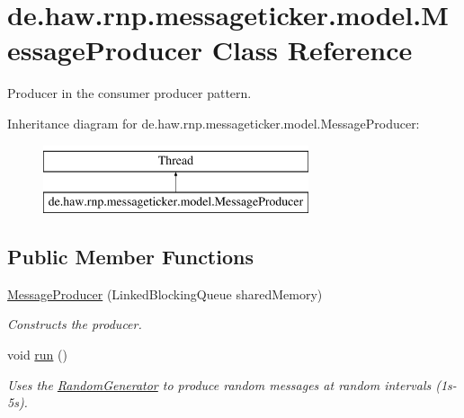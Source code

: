 \hypertarget{classde_1_1haw_1_1rnp_1_1messageticker_1_1model_1_1MessageProducer}{\section{de.\-haw.\-rnp.\-messageticker.\-model.\-Message\-Producer Class Reference}
\label{classde_1_1haw_1_1rnp_1_1messageticker_1_1model_1_1MessageProducer}
}


Producer in the consumer producer pattern.  


Inheritance diagram for de.\-haw.\-rnp.\-messageticker.\-model.\-Message\-Producer\-:\begin{figure}[H]
\begin{center}
\leavevmode
\includegraphics[height=2.000000cm]{classde_1_1haw_1_1rnp_1_1messageticker_1_1model_1_1MessageProducer}
\end{center}
\end{figure}
\subsection*{Public Member Functions}
\begin{DoxyCompactItemize}
\item 
\hyperlink{classde_1_1haw_1_1rnp_1_1messageticker_1_1model_1_1MessageProducer_a87904a84507bffe8983f275cd15b8f81}{Message\-Producer} (Linked\-Blocking\-Queue shared\-Memory)
\begin{DoxyCompactList}\small\item\em Constructs the producer. \end{DoxyCompactList}\item 
\hypertarget{classde_1_1haw_1_1rnp_1_1messageticker_1_1model_1_1MessageProducer_ae3e7a64de567365dfde2882a2b9e96aa}{void \hyperlink{classde_1_1haw_1_1rnp_1_1messageticker_1_1model_1_1MessageProducer_ae3e7a64de567365dfde2882a2b9e96aa}{run} ()}\label{classde_1_1haw_1_1rnp_1_1messageticker_1_1model_1_1MessageProducer_ae3e7a64de567365dfde2882a2b9e96aa}

\begin{DoxyCompactList}\small\item\em Uses the \hyperlink{classde_1_1haw_1_1rnp_1_1messageticker_1_1model_1_1RandomGenerator}{Random\-Generator} to produce random messages at random intervals (1s-\/5s). \end{DoxyCompactList}\end{DoxyCompactItemize}


